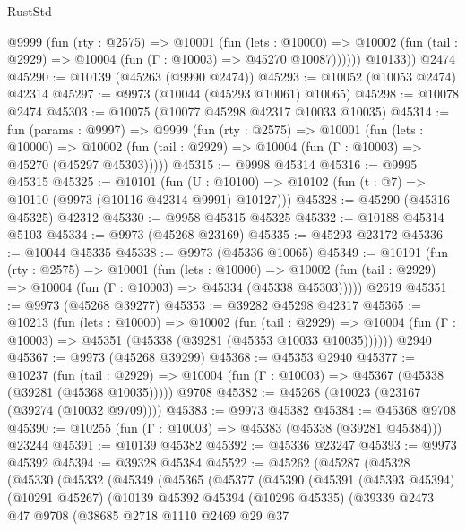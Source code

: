 \begin{lexlean}{RustStd}
\begin{coremodule}
          @9999
            (fun (rty : @2575) =>
            @10001
              (fun (lets : @10000) =>
              @10002 (fun (tail : @2929) => @10004 (fun (Γ : @10003) => @45270 @10087))))))
        @10133))
    @2474
@45290 := @10139 (@45263 (@9990 @2474))
@45293 := @10052 (@10053 @2474) @42314
@45297 := @9973 (@10044 (@45293 @10061) @10065)
@45298 := @10078 @2474
@45303 := @10075 (@10077 @45298 @42317 @10033 @10035)
@45314 := fun (params : @9997) =>
  @9999
    (fun (rty : @2575) =>
    @10001
      (fun (lets : @10000) =>
      @10002 (fun (tail : @2929) => @10004 (fun (Γ : @10003) => @45270 (@45297 @45303)))))
@45315 := @9998 @45314
@45316 := @9995 @45315
@45325 := @10101
    (fun (U : @10100) => @10102 (fun (t : @7) => @10110 (@9973 (@10116 @42314 @9991) @10127)))
@45328 := @45290 (@45316 @45325) @42312
@45330 := @9958 @45315 @45325
@45332 := @10188 @45314 @5103
@45334 := @9973 (@45268 @23169)
@45335 := @45293 @23172
@45336 := @10044 @45335
@45338 := @9973 (@45336 @10065)
@45349 := @10191
    (fun (rty : @2575) =>
    @10001
      (fun (lets : @10000) =>
      @10002 (fun (tail : @2929) => @10004 (fun (Γ : @10003) => @45334 (@45338 @45303)))))
    @2619
@45351 := @9973 (@45268 @39277)
@45353 := @39282 @45298 @42317
@45365 := @10213
    (fun (lets : @10000) =>
    @10002
      (fun (tail : @2929) =>
      @10004 (fun (Γ : @10003) => @45351 (@45338 (@39281 (@45353 @10033 @10035))))))
    @2940
@45367 := @9973 (@45268 @39299)
@45368 := @45353 @2940
@45377 := @10237
    (fun (tail : @2929) => @10004 (fun (Γ : @10003) => @45367 (@45338 (@39281 (@45368 @10035)))))
    @9708
@45382 := @45268 (@10023 (@23167 (@39274 (@10032 @9709))))
@45383 := @9973 @45382
@45384 := @45368 @9708
@45390 := @10255 (fun (Γ : @10003) => @45383 (@45338 (@39281 @45384))) @23244
@45391 := @10139 @45382
@45392 := @45336 @23247
@45393 := @9973 @45392
@45394 := @39328 @45384
@45522 := @45262
    (@45287
      (@45328
        (@45330
          (@45332
            (@45349
              (@45365
                (@45377
                  (@45390
                    (@45391
                      (@45393 @45394)
                      (@10291 @45267)
                      (@10139
                        @45392
                        @45394
                        (@10296 @45335)
                        (@39339
                          @2473
                          @47
                          @9708
                          (@38685
                            @2718
                            @1110
                            @2469
                            @29
                            @37

\end{coremodule}
\end{lexlean}
